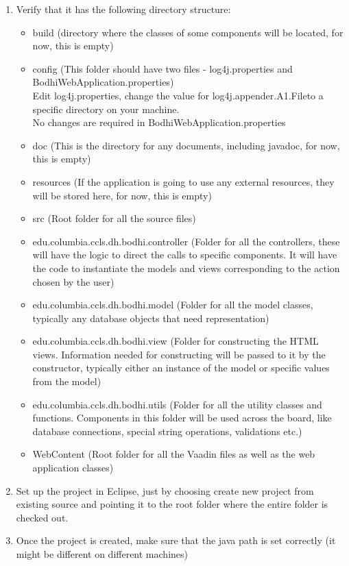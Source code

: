 \documentclass[amsart, 12pt]{article}
\begin{document}
\begin{enumerate}
\item Verify that it has the following directory structure:
\begin{itemize}
    \item build (directory where the classes of some components will be located, for now, this is empty)
\item config (This folder should have two files - log4j.properties and BodhiWebApplication.properties)\\
Edit log4j.properties, change the value for \textasciigrave log4j.appender.A1.File\textasciiacute to a specific directory on your machine.\\
No changes are required in BodhiWebApplication.properties
\item doc (This is the directory for any documents, including javadoc, for now, this is empty)
\item resources (If the application is going to use any external resources, they will be stored here, for now, this is empty)
\item src (Root folder for all the source files)
\item edu.columbia.ccls.dh.bodhi.controller (Folder for all the controllers, these will have the logic to direct the calls to specific components. It will have the code to instantiate the models and views corresponding to the action chosen by the user)
\item edu.columbia.ccls.dh.bodhi.model (Folder for all the model classes, typically any database objects that need representation)
\item edu.columbia.ccls.dh.bodhi.view (Folder for constructing the HTML views. Information needed for constructing will be passed to it by the constructor, typically either an instance of the model or specific values from the model)
\item edu.columbia.ccls.dh.bodhi.utils (Folder for all the utility classes and functions. Components in this folder will be used across the board, like database connections, special string operations, validations etc.)
\item WebContent (Root folder for all the Vaadin files as well as the web application classes)
\end{itemize}

\item Set up the project in Eclipse, just by choosing create new project from existing source and pointing it to the root folder where the entire folder is checked out.

\item Once the project is created, make sure that the java path is set correctly (it might be different on different machines)


\end{enumerate}
\end{document}
